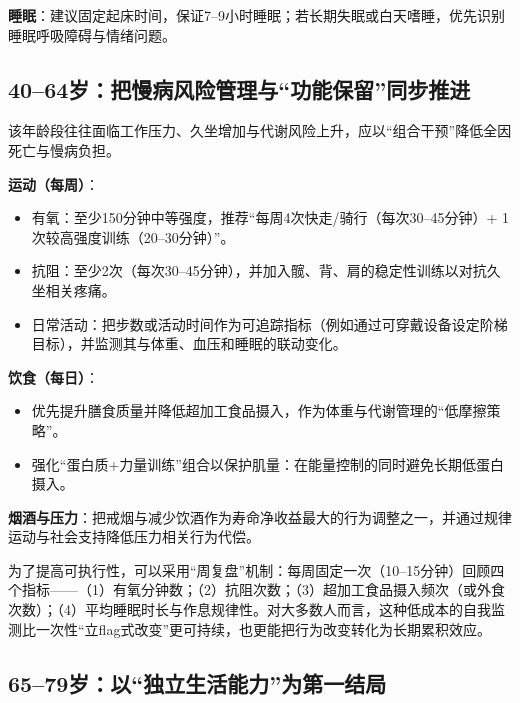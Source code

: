 \documentclass[11pt,a4paper]{article}
\begin{document}
\textbf{睡眠}：建议固定起床时间，保证7--9小时睡眠；若长期失眠或白天嗜睡，优先识别睡眠呼吸障碍与情绪问题\cite{aasm2015sleep}。

\subsection{40--64岁：把慢病风险管理与“功能保留”同步推进}

该年龄段往往面临工作压力、久坐增加与代谢风险上升，应以“组合干预”降低全因死亡与慢病负担。\cite{associationofhealthy2021,healthylifestyleand2023}

\textbf{运动（每周）}：
\begin{itemize}
  \item 有氧：至少150分钟中等强度，推荐“每周4次快走/骑行（每次30--45分钟）+ 1次较高强度训练（20--30分钟）”\cite{who2020physicalactivity,pagac2018}。
  \item 抗阻：至少2次（每次30--45分钟），并加入髋、背、肩的稳定性训练以对抗久坐相关疼痛。
  \item 日常活动：把步数或活动时间作为可追踪指标（例如通过可穿戴设备设定阶梯目标），并监测其与体重、血压和睡眠的联动变化\cite{dailystepsand2022,accelerometermeasuredphysical2020}。
\end{itemize}

\textbf{饮食（每日）}：
\begin{itemize}
  \item 优先提升膳食质量并降低超加工食品摄入，作为体重与代谢管理的“低摩擦策略”\cite{ultraprocessedfood2021,ultraprocessedfood2022}。
  \item 强化“蛋白质+力量训练”组合以保护肌量：在能量控制的同时避免长期低蛋白摄入\cite{anincreasedneed2015}。
\end{itemize}

\textbf{烟酒与压力}：把戒烟与减少饮酒作为寿命净收益最大的行为调整之一，并通过规律运动与社会支持降低压力相关行为代偿\cite{effectsoftobacco2015,commentaryondi2021,impactofsocial2020}。

为了提高可执行性，可以采用“周复盘”机制：每周固定一次（10--15分钟）回顾四个指标——（1）有氧分钟数；（2）抗阻次数；（3）超加工食品摄入频次（或外食次数）；（4）平均睡眠时长与作息规律性。对大多数人而言，这种低成本的自我监测比一次性“立flag式改变”更可持续，也更能把行为改变转化为长期累积效应。

\subsection{65--79岁：以“独立生活能力”为第一结局}
\end{document}
